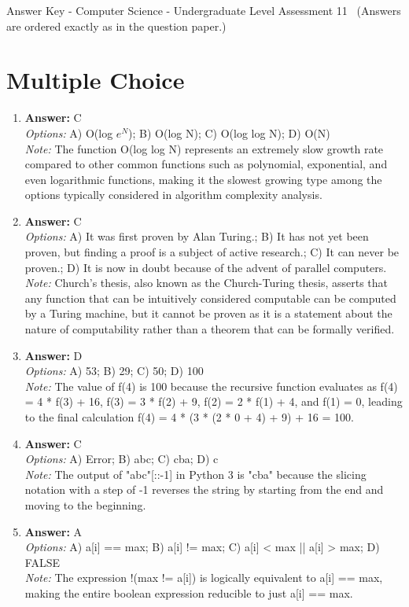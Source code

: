 \documentclass[12pt]{article}
\begin{document}
\begin{center}
Answer Key - Computer Science - Undergraduate Level Assessment 11 \
\small (Answers are ordered exactly as in the question paper.)
\end{center}

\section*{Multiple Choice}
\begin{enumerate}[label=\arabic*.]
\item \textbf{Answer:} C
\\ \textit{Options:} A) O(log $e^N$); B) O(log N); C) O(log log N); D) O(N)
\\ \textit{Note:} The function O(log log N) represents an extremely slow growth rate compared to other common functions such as polynomial, exponential, and even logarithmic functions, making it the slowest growing type among the options typically considered in algorithm complexity analysis.
\item \textbf{Answer:} C
\\ \textit{Options:} A) It was first proven by Alan Turing.; B) It has not yet been proven, but finding a proof is a subject of active research.; C) It can never be proven.; D) It is now in doubt because of the advent of parallel computers.
\\ \textit{Note:} Church's thesis, also known as the Church-Turing thesis, asserts that any function that can be intuitively considered computable can be computed by a Turing machine, but it cannot be proven as it is a statement about the nature of computability rather than a theorem that can be formally verified.
\item \textbf{Answer:} D
\\ \textit{Options:} A) 53; B) 29; C) 50; D) 100
\\ \textit{Note:} The value of f(4) is 100 because the recursive function evaluates as f(4) = 4 * f(3) + 16, f(3) = 3 * f(2) + 9, f(2) = 2 * f(1) + 4, and f(1) = 0, leading to the final calculation f(4) = 4 * (3 * (2 * 0 + 4) + 9) + 16 = 100.
\item \textbf{Answer:} C
\\ \textit{Options:} A) Error; B) abc; C) cba; D) c
\\ \textit{Note:} The output of "abc"[::-1] in Python 3 is "cba" because the slicing notation with a step of -1 reverses the string by starting from the end and moving to the beginning.
\item \textbf{Answer:} A
\\ \textit{Options:} A) a[i] == max; B) a[i] != max; C) a[i] \textless{} max || a[i] \textgreater{} max; D) FALSE
\\ \textit{Note:} The expression !(max != a[i]) is logically equivalent to a[i] == max, making the entire boolean expression reducible to just a[i] == max.
\end{enumerate}
\end{document}
